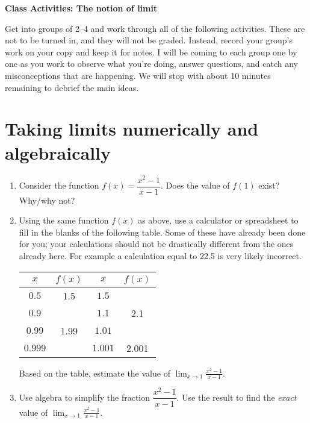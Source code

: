\documentclass[11pt]{article}
\begin{document}
	
	\thispagestyle{empty}
	\renewcommand{\headrulewidth}{0.0pt}
	\thispagestyle{fancy}
	\lfoot{}
	\cfoot{}
	\rfoot{}	
	
	\vspace*{0in}

		\begin{center}
			\begin{large}
			\textbf{Class Activities: The notion of limit} \\
			\end{large}
		\end{center}
	
Get into groups of 2--4 and work through all of the following activities. These are not to be turned in, and they will not be graded. Instead, record your group's work on your copy and keep it for notes. I will be coming to each group one by one as you work to observe what you're doing, answer questions, and catch any misconceptions that are happening. We will stop with about 10 minutes remaining to debrief the main ideas. 


\section{Taking limits numerically and algebraically}

\begin{enumerate}
	\item Consider the function $f(x) = \dfrac{x^2 - 1}{x - 1}$. Does the value of $f(1)$ exist? Why/why not?
	
	
	\item Using the same function $f(x)$ as above, use a calculator or spreadsheet to fill in the blanks of the following table. Some of these have already been done for you; your calculations should not be drastically different from the ones already here. For example a calculation equal to 22.5 is very likely incorrect. 
	\begin{center}
		\begin{tabular}{c|c||c|c}
		$x$ & $f(x)$ & $x$ & $f(x)$ \\ \hline
		$0.5$ & 1.5 & $1.5$ & \hspace{1in} \\
		$0.9$ & \hspace{1in} & $1.1$ & 2.1 \\
		$0.99$ & 1.99 & $1.01$ & \hspace{1in} \\
		$0.999$ & \hspace{1in} & $1.001$ & 2.001 \\
		\end{tabular}
	\end{center}
Based on the table, estimate the value of $\displaystyle{\lim_{x \to 1} \frac{x^2 - 1}{x-1}}$. 

	\item Use algebra to simplify the fraction $\dfrac{x^2 - 1}{x - 1}$. Use the result to find the \emph{exact} value of $\displaystyle{\lim_{x \to 1} \frac{x^2 - 1}{x-1}}$.  
	
\end{enumerate}
\end{document}
